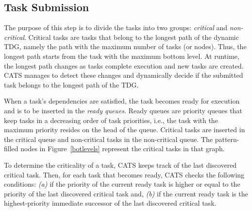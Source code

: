 \subsection{Task Submission}


The purpose of this step is to divide the tasks into two groups: \textit{critical} and \textit{non-critical}. Critical tasks are tasks that belong to the longest path of the dynamic TDG, namely the path  with the maximum number of tasks (or nodes). Thus, the longest path starts from the task with the maximum bottom level. At runtime, the longest path changes as tasks complete execution and new tasks are created. CATS manages to detect these changes and dynamically decide if the submitted task belongs to the longest path of the TDG.

When a task's dependencies are satisfied, the task becomes ready for execution and is to be inserted in the \textit{ready queues}. Ready queues are priority queues that keep tasks in a decreasing order of task priorities, i.e., the task with the maximum priority resides on the head of the queue. Critical tasks are inserted in the critical queue and non-critical tasks in the non-critical queue. The pattern-filled nodes in Figure~\ref{botlevels} represent the critical tasks in that graph. 


To determine the criticality of a task, CATS keeps track of the last discovered critical task. Then, for each task that becomes ready, CATS checks the following conditions:
\textit{(a)} if the priority of the current ready task is higher or equal to the priority of the last discovered critical task and, \textit{(b)} if the current ready task is the highest-priority immediate successor of the last discovered critical task.


